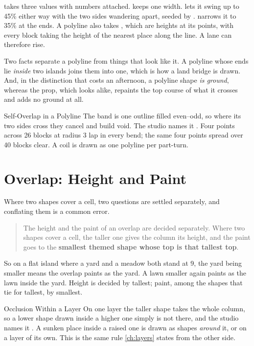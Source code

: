  takes three values with numbers attached.  keeps one
width.  lets it swing up to 45\% either way with the two sides wandering
apart, seeded by .  narrows it to 35\% at the ends.
A polyline also takes , which are heights at its points, with
every block taking the height of the nearest place along the line. A lane can
therefore rise.

Two facts separate a polyline from things that look like it. A polyline whose ends
lie \emph{inside} two islands joins them into one, which is how a land bridge is
drawn. And, in the distinction that costs an afternoon, a polyline shape \emph{is
ground}, whereas the  prop, which looks alike, repaints the top course
of what it crosses and adds no ground at all.

\begin{ruling}{Self-Overlap in a Polyline}
The band is one outline filled even--odd, so where its two sides cross they cancel
and build void. The studio names it . Four points across 26 blocks at
radius 3 lap in every bend; the same four points spread over 40 blocks clear. A
coil is drawn as one polyline per part-turn.
\end{ruling}

\section{Overlap: Height and Paint}

Where two shapes cover a cell, two questions are settled separately, and conflating
them is a common error.

\begin{quote}
The height and the paint of an overlap are decided separately. Where two shapes
cover a cell, the taller one gives the column its height, and the paint goes to the
\textbf{smallest themed shape whose top is that tallest top}.
\end{quote}

So on a flat island where a yard and a meadow both stand at 9, the yard being
smaller means the overlap paints as the yard. A lawn smaller again paints as the
lawn inside the yard. Height is decided by tallest; paint, among the shapes that
tie for tallest, by smallest.

\begin{ruling}{Occlusion Within a Layer}
On one layer the taller shape takes the whole column, so a lower shape drawn inside
a higher one simply is not there, and the studio names it . A sunken place
inside a raised one is drawn as shapes \emph{around} it, or on a layer of its own. This is the same rule \cref{ch:layers} states from the other side.
\end{ruling}

